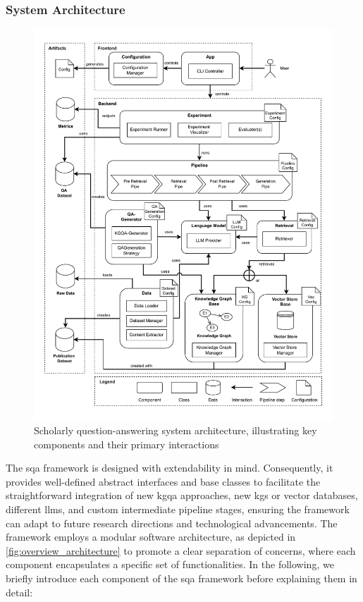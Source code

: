 \subsubsection{System Architecture}

\begin{figure}[p]
    \centering
    \includegraphics[width=0.99\linewidth]{figures/framework/overview-Architecture.drawio.pdf}
    \caption[SQA System Architecture]{Scholarly question-answering system architecture, illustrating key components and their primary interactions}
    \label{fig:overview_architecture}
\end{figure}

The \gls{sqa} framework is designed with extendability in mind. Consequently, it provides well-defined abstract interfaces and base classes to facilitate the straightforward integration of new \gls{kgqa} approaches, new \glspl{kg} or vector databases, different \glspl{llm}, and custom intermediate pipeline stages, ensuring the framework can adapt to future research directions and technological advancements. The framework employs a modular software architecture, as depicted in \autoref{fig:overview_architecture} to promote a clear separation of concerns, where each component encapsulates a specific set of functionalities. In the following, we briefly introduce each component of the \gls{sqa} framework before explaining them in detail:

